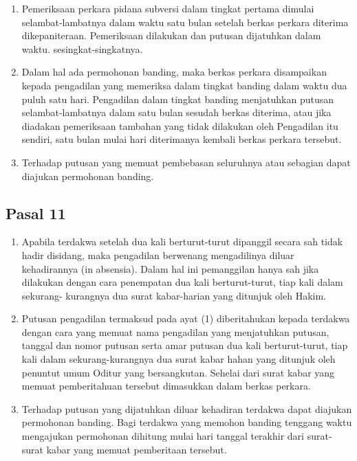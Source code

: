 \documentclass{article}
\begin{document}
\begin{enumerate}
\item Pemeriksaan perkara pidana subversi dalam tingkat pertama dimulai selambat-lambatnya dalam
waktu satu bulan setelah berkas perkara diterima dikepaniteraan.
Pemeriksaan dilakukan dan putusan dijatuhkan dalam waktu. sesingkat-singkatnya.
\item Dalam hal ada permohonan banding, maka berkas perkara disampaikan kepada pengadilan yang
memeriksa dalam tingkat banding dalam waktu dua puluh satu hari. Pengadilan dalam tingkat
banding menjatuhkan putusan selambat-lambatnya dalam satu bulan sesudah berkas diterima,
atau jika diadakan pemeriksaan tambahan yang tidak dilakukan oleh Pengadilan itu sendiri, satu
bulan mulai hari diterimanya kembali berkas perkara tersebut.
\item Terhadap putusan yang memuat pembebasan seluruhnya atau sebagian dapat diajukan
permohonan banding.
\end{enumerate}

\subsection*{\centering{}Pasal 11}

\begin{enumerate}
\item Apabila terdakwa setelah dua kali berturut-turut dipanggil secara sah tidak hadir disidang, maka
pengadilan berwenang mengadilinya diluar kehadirannya (in absensia). Dalam hal ini pemanggilan
hanya sah jika dilakukan dengan cara penempatan dua kali berturut-turut, tiap kali dalam sekurang-
kurangnya dua surat kabar-harian yang ditunjuk oleh Hakim.
\item Putusan pengadilan termaksud pada ayat (1) diberitahukan kepada terdakwa dengan cara yang
memuat nama pengadilan yang menjatuhkan putusan, tanggal dan nomor putusan serta amar
putusan dua kali berturut-turut, tiap kali dalam sekurang-kurangnya dua surat kabar hahan yang
ditunjuk oleh penuntut umum Oditur yang bersangkutan. Sehelai dari surat kabar yang memuat
pemberitahuan tersebut dimasukkan dalam berkas perkara.
\item Terhadap putusan yang dijatuhkan diluar kehadiran terdakwa dapat diajukan permohonan banding.
Bagi terdakwa yang memohon banding tenggang waktu mengajukan permohonan dihitung mulai
hari tanggal terakhir dari surat-surat kabar yang memuat pemberitaan tersebut.
\end{enumerate}
\end{document}
